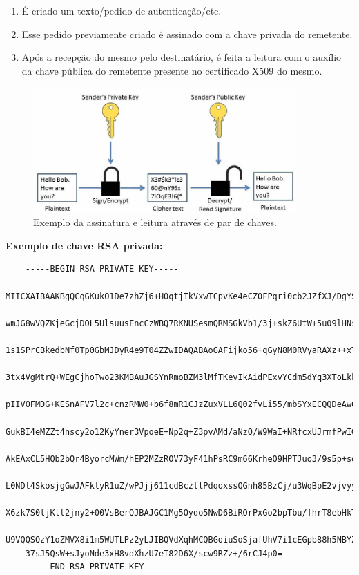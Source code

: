 \begin{enumerate}
    \item É criado um texto/pedido de autenticação/etc.
    \item Esse pedido previamente criado é assinado com a chave privada do remetente.
    \item Após a recepção do mesmo pelo destinatário, é feita a leitura com o auxílio da chave pública do remetente presente no certificado X509 do mesmo.
\end{enumerate}

\cleardoublepage
\begin{figure}[h]
    \centering
    \includegraphics[width=0.9\textwidth]{img/cc/OpenPGPSign.jpg}
    \caption{Exemplo da assinatura e leitura através de par de chaves.}
    \label{fig:par_chaves}
\end{figure}

\textbf{Exemplo de chave RSA privada:}

\begin{verbatim}
    -----BEGIN RSA PRIVATE KEY-----
    MIICXAIBAAKBgQCqGKukO1De7zhZj6+H0qtjTkVxwTCpvKe4eCZ0FPqri0cb2JZfXJ/DgYSF6vUp
    wmJG8wVQZKjeGcjDOL5UlsuusFncCzWBQ7RKNUSesmQRMSGkVb1/3j+skZ6UtW+5u09lHNsj6tQ5
    1s1SPrCBkedbNf0Tp0GbMJDyR4e9T04ZZwIDAQABAoGAFijko56+qGyN8M0RVyaRAXz++xTqHBLh
    3tx4VgMtrQ+WEgCjhoTwo23KMBAuJGSYnRmoBZM3lMfTKevIkAidPExvYCdm5dYq3XToLkkLv5L2
    pIIVOFMDG+KESnAFV7l2c+cnzRMW0+b6f8mR1CJzZuxVLL6Q02fvLi55/mbSYxECQQDeAw6fiIQX
    GukBI4eMZZt4nscy2o12KyYner3VpoeE+Np2q+Z3pvAMd/aNzQ/W9WaI+NRfcxUJrmfPwIGm63il
    AkEAxCL5HQb2bQr4ByorcMWm/hEP2MZzROV73yF41hPsRC9m66KrheO9HPTJuo3/9s5p+sqGxOlF
    L0NDt4SkosjgGwJAFklyR1uZ/wPJjj611cdBcztlPdqoxssQGnh85BzCj/u3WqBpE2vjvyyvyI5k
    X6zk7S0ljKtt2jny2+00VsBerQJBAJGC1Mg5Oydo5NwD6BiROrPxGo2bpTbu/fhrT8ebHkTz2epl
    U9VQQSQzY1oZMVX8i1m5WUTLPz2yLJIBQVdXqhMCQBGoiuSoSjafUhV7i1cEGpb88h5NBYZzWXGZ
    37sJ5QsW+sJyoNde3xH8vdXhzU7eT82D6X/scw9RZz+/6rCJ4p0=
    -----END RSA PRIVATE KEY-----
\end{verbatim}

